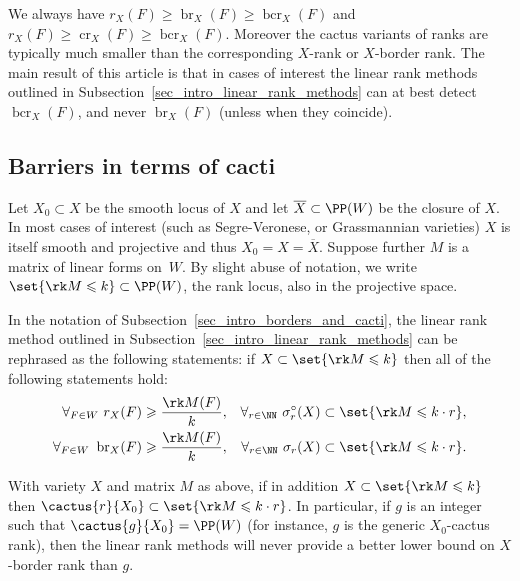 \documentclass[12pt,a4paper]{article}
\newcommand{\borderrank}[2][X]{\operatorname{br}_{#1}(#2)}
\newcommand{\cactusrank}[2][X]{\operatorname{cr}_{#1}(#2)}
\newcommand{\bordercactusrank}[2][X]{\operatorname{bcr}_{#1}(#2)}
\begin{document}
We always have
$r_X(F) \geqslant \borderrank{F} \geqslant \bordercactusrank{F}$
and
$r_X(F) \geqslant \cactusrank{F} \geqslant \bordercactusrank{F}$.
Moreover the cactus variants of ranks are typically much smaller than the corresponding $X$-rank or $X$-border rank.
The main result of this article is that in cases of interest the linear rank methods outlined in Subsection~\ref{sec_intro_linear_rank_methods} can at best detect
$\bordercactusrank{F}$, and never $\borderrank{F}$ (unless when they coincide).


\subsection{Barriers in terms of cacti}

Let $X_0\subset X$ be the smooth locus of $X$ and let $ \overline{X}\subset \PP(W)$ be the closure of $X$.
In most cases of interest (such as Segre-Veronese, or Grassmannian varieties) $X$ is itself smooth and projective and thus $X_0=X=\overline{X}$.
Suppose further $M$ is a matrix of linear forms on~$W$.
By slight abuse of notation, we write $\set{\rk M \leqslant k} \subset \PP(W)$, the rank locus, also in the projective space.

In the notation of Subsection~\ref{sec_intro_borders_and_cacti},
the linear rank method outlined in Subsection~\ref{sec_intro_linear_rank_methods} can be rephrased as the following statements:
if $X\subset \set{\rk M \leqslant k}$ then all of the following statements hold:
\begin{align*}
   \forall_{F\in W} \ r_X(F) & \geqslant \frac{\rk M(F)}{k}, &
   \forall_{r\in \NN} \ \sigma^{\circ}_r(X)  & \subset \set{\rk M \leqslant k\cdot r},
   \\
\forall_{F\in W} \ \borderrank{F} & \geqslant \frac{\rk M(F)}{k},
&
   \forall_{r\in \NN} \ \sigma_r(X)  & \subset \set{\rk M \leqslant k\cdot r}.
\end{align*}

\begin{thm}
   \label{thm_cactus_barriers_intro}
   With variety $X$ and matrix $M$ as above, if in addition $X\subset \set{\rk M \leqslant k}$
   then $\cactus{r}{X_0} \subset \set{\rk M \leqslant k \cdot r}$.
   In particular, if $g$ is an integer such that
   $\cactus{g}{X_0} = \PP(W)$ (for instance, $g$ is the generic $X_0$-cactus rank), then the linear rank methods will never provide a better lower bound on $X$-border rank than $g$.
\end{thm}
\end{document}
